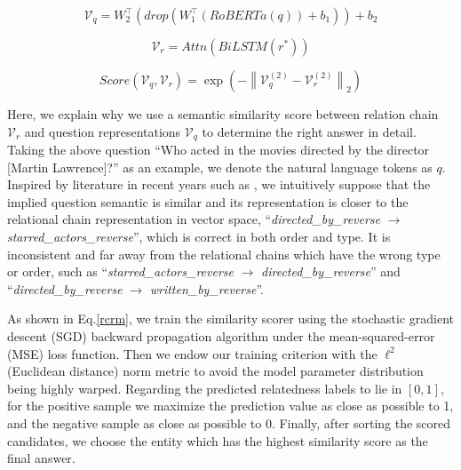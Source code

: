 \documentclass[pdflatex,sn-mathphys]{sn-jnl}%
\theoremstyle{thmstyleone}%
\theoremstyle{thmstyletwo}%
\theoremstyle{thmstylethree}%
\begin{document}
\begin{equation}
\label{rcrmq}
\mathcal{V}_{q} = W_{2}^{\top}(drop(W_{1}^{\top}(RoBERTa(q))+b_{1}))+b_{2}
\end{equation}

\begin{equation}
\label{rcrmr}
\mathcal{V}_{r} = Attn(BiLSTM(r^{*}))
\end{equation}

\begin{equation}
\label{rcrm}
 Score(\mathcal{V}_{q},\mathcal{V}_{r}) = \exp \left(-\left\|\mathcal{V}_{q}^{(2)}-\mathcal{V}_{r}^{(2)}\right\|_{2}\right)
\end{equation}

Here, we explain why we use a semantic similarity score between relation chain $\mathcal{V}_{r}$ and question representations $\mathcal{V}_{q}$ to determine the right answer in detail. Taking the above question ``Who acted in the movies directed by the director [Martin Lawrence]?'' as an example, we denote the natural language tokens as $q$. \textcolor[rgb]{1,0,0}{Inspired by literature in recent years such as \cite{pmlrv162das22a,fu2020surveyQA}, we intuitively 
suppose that the implied question semantic is similar and its representation is closer to the relational chain representation in vector space}, ``\textit{directed\_by\_reverse} $\rightarrow$ \textit{starred\_actors\_reverse}'', which is correct in both order and type. It is inconsistent and far away from the relational chains which have the wrong type or order, such as ``\textit{starred\_actors\_reverse} 
$\rightarrow$ \textit{directed\_by\_reverse}'' and ``\textit{directed\_by\_reverse} $\rightarrow$ \textit{written\_by\_reverse}''.

As shown in Eq.\ref{rcrm}, we train the similarity scorer using the stochastic gradient descent (SGD) backward propagation algorithm under the mean-squared-error (MSE) loss function. Then we endow our training criterion with the $\ell^{2}$ (Euclidean distance) norm metric to avoid the model parameter distribution being highly warped. Regarding the predicted relatedness labels to lie in $[0, 1]$, for the positive sample we maximize the prediction value as close as possible to 1, and the negative sample as close as possible to 0. Finally, after sorting the scored candidates, we choose the entity which has the highest similarity score as the final answer.
\end{document}
